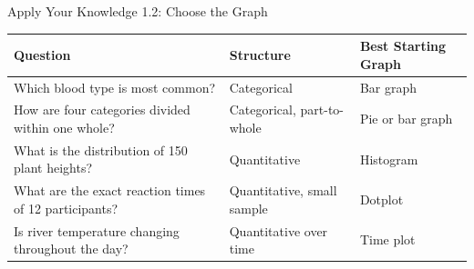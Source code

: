 \documentclass[aspectratio=169]{beamer}
\begin{document}
\begin{frame}{Apply Your Knowledge 1.2: Choose the Graph}
  \begin{table}
    \centering
    \small
    \begin{tabularx}{\textwidth}{X X l}
      \toprule
      \textbf{Question} & \textbf{Structure} & \textbf{Best Starting Graph} \\
      \midrule
      Which blood type is most common? & Categorical & Bar graph \\
      How are four categories divided within one whole? & Categorical, part-to-whole & Pie or bar graph \\
      What is the distribution of 150 plant heights? & Quantitative & Histogram \\
      What are the exact reaction times of 12 participants? & Quantitative, small sample & Dotplot \\
      Is river temperature changing throughout the day? & Quantitative over time & Time plot \\
      \bottomrule
    \end{tabularx}
  \end{table}
\end{frame}

\end{document}
